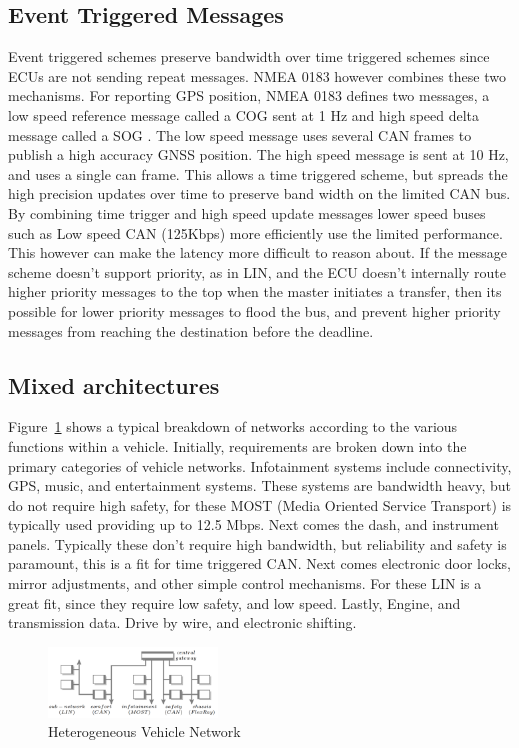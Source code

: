 \documentclass[conference,12pt]{IEEEtran}
\begin{document}
\subsection{Event Triggered Messages}
Event triggered schemes preserve bandwidth over time triggered schemes since
ECUs are not sending repeat messages. NMEA 0183 however combines these two
mechanisms. For reporting GPS position, NMEA 0183 defines two messages, a low speed
reference message called a COG sent at 1 Hz and high speed delta message called a SOG
\autocite{_nmea}. The
low speed message uses several CAN frames to publish a high accuracy GNSS
position. The high speed message is sent at 10 Hz, and uses a single can frame.
This allows a time triggered scheme, but spreads the high precision updates over
time to preserve band width on the limited CAN bus.  By combining time trigger
and high speed update messages lower speed
buses such as Low speed CAN (125Kbps) more efficiently use the
limited performance. This however can make the latency more difficult to reason
about. If the message scheme doesn't support priority, as in LIN, and the ECU
doesn't internally route higher priority messages to the top when the master
initiates a transfer, then its possible for
lower priority messages to flood the bus, and prevent higher priority messages
from reaching the destination before the deadline. 

\subsection{Mixed architectures}
Figure~\ref{fig:heterogenous_network} shows a typical breakdown of networks
according to the various functions within a vehicle. Initially, requirements are
broken down into the primary categories of vehicle networks.  Infotainment
systems include connectivity, GPS, music, and entertainment systems. These
systems are bandwidth heavy, but do not require high safety, for these MOST
(Media Oriented Service Transport) is typically used providing up to 12.5 Mbps.
Next comes the dash, and instrument panels. Typically these don't require high
bandwidth, but reliability and safety is paramount, this is a fit for time
triggered CAN.  Next comes electronic door locks, mirror adjustments, and other
simple control mechanisms. For these LIN is a great fit, since they require low
safety, and low speed.  Lastly, Engine, and transmission data. Drive by wire,
and electronic shifting. 
\begin{figure}
  \centering
  \includegraphics[width=0.4\textwidth]{network_topography.png}
  \caption{Heterogeneous Vehicle Network \autocite{lukasiewycz_system_2013}}
  \label{fig:heterogenous_network}
\end{figure}
\end{document}
